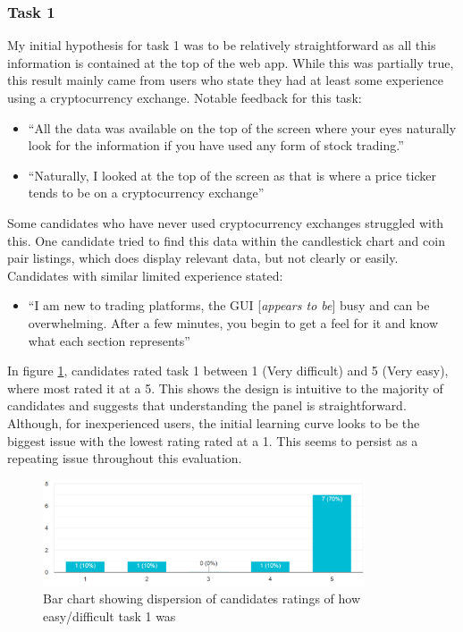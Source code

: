 \subsubsection{Task 1}
\label{sec:evaluation:ui:tasks:q1}
\noindent My initial hypothesis for task 1 was to be relatively straightforward as all this information is contained at the top of the web app. While this was partially true, this result mainly came from users who state they had at least some experience using a cryptocurrency exchange. Notable feedback for this task:
\begin{itemize}
\item ``All the data was available on the top of the screen where your eyes naturally look for the information if you have used any form of stock trading.''
\item  ``Naturally, I looked at the top of the screen as that is where a price ticker tends to be on a cryptocurrency exchange''
\end{itemize}

\noindent Some candidates who have never used cryptocurrency exchanges struggled with this. One candidate tried to find this data within the candlestick chart and coin pair listings, which does display relevant data, but not clearly or easily. Candidates with similar limited experience stated:
\begin{itemize}
\item ``I am new to trading platforms, the GUI [\textit{appears to be}] busy and can be overwhelming. After a few minutes, you begin to get a feel for it and know what each section represents'' 
\end{itemize}


\noindent In figure \ref{fig:eval:web_app:task1_was_it_easy}, candidates rated task 1 between 1 (Very difficult) and 5 (Very easy), where most rated it at a 5. This shows the design is intuitive to the majority of candidates and suggests that understanding the panel is straightforward. Although, for inexperienced users, the initial learning curve looks to be the biggest issue with the lowest rating rated at a 1. This seems to persist as a repeating issue throughout this evaluation.

  \begin{figure}[ht]
  \centering
 \includegraphics[width=0.85\textwidth]{content/graphics/task1_was_it_easy.PNG}
  \caption{Bar chart showing dispersion of candidates ratings of how easy/difficult task 1 was}
  \label{fig:eval:web_app:task1_was_it_easy}
\end{figure}


